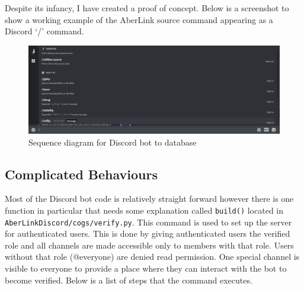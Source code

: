 Despite its infancy, I have created a proof of concept. Below is a screenshot to show a working example of the AberLink source command appearing as a Discord `/' command.
\begin{figure}[H]
	\centering
	\includegraphics[width=1\linewidth]{Figures/discord-slash.png}
	\caption{Sequence diagram for Discord bot to database}
	\label{fig:architecture-dis-slash}
\end{figure}

\subsection{Complicated Behaviours}\label{sec2:comp-behaviour}
Most of the Discord bot code is relatively straight forward however there is one function in particular that needs some explanation called \verb|build()| located in \verb|AberLinkDiscord/cogs/verify.py|. This command is used to set up the server for authenticated users. This is done by giving authenticated users the verified role and all channels are made accessible only to members with that role. Users without that role (@everyone) are denied read permission. One special channel is visible to everyone to provide a place where they can interact with the bot to become verified. Below is a list of steps that the command executes.

